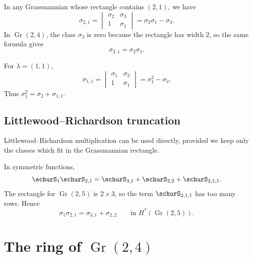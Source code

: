 \begin{example*}
In any Grassmannian whose rectangle contains $(2,1)$, we have
\[
  \sigma_{2,1}
  =
  \begin{vmatrix}
    \sigma_2 & \sigma_3\\
    1 & \sigma_1
  \end{vmatrix}
  =
  \sigma_2\sigma_1-\sigma_3.
\]
In $\operatorname{Gr}(2,4)$, the class $\sigma_3$ is zero because the rectangle
has width $2$, so the same formula gives
\[
  \sigma_{2,1}=\sigma_2\sigma_1.
\]
\end{example*}

\begin{example*}
For $\lambda=(1,1)$,
\[
  \sigma_{1,1}
  =
  \begin{vmatrix}
    \sigma_1 & \sigma_2\\
    1 & \sigma_1
  \end{vmatrix}
  =
  \sigma_1^2-\sigma_2.
\]
Thus $\sigma_1^2=\sigma_2+\sigma_{1,1}$.
\end{example*}


\subsection[schubertCalculusLRTruncation]{Littlewood--Richardson truncation}

Littlewood--Richardson multiplication can be used directly, provided we keep
only the classes which fit in the Grassmannian rectangle.

\begin{example*}
In symmetric functions,
\[
  \schurS_1\schurS_{2,1}
  =
  \schurS_{3,1}+\schurS_{2,2}+\schurS_{2,1,1}.
\]
The rectangle for $\operatorname{Gr}(2,5)$ is $2\times3$, so the term
$\schurS_{2,1,1}$ has too many rows.  Hence
\[
  \sigma_1\sigma_{2,1}
  =
  \sigma_{3,1}+\sigma_{2,2}
  \qquad\text{in } H^*(\operatorname{Gr}(2,5)).
\]
\end{example*}


\section[schubertCalculusGr24]{The ring of $\operatorname{Gr}(2,4)$}

